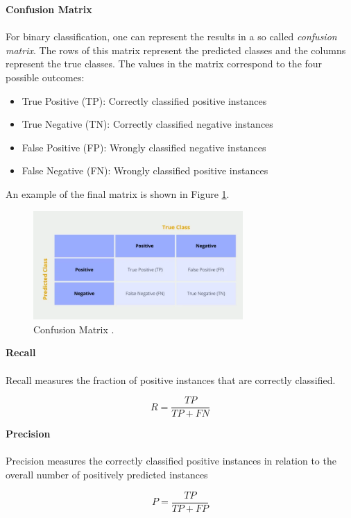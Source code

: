 \textbf{Confusion Matrix} \\ \\
For binary classification, one can represent the results in a so called \textit{confusion matrix}. The rows of this matrix represent the predicted classes and the columns represent the true classes. The values in the matrix correspond to the four possible outcomes:
\begin{itemize}
	\item[\textbullet] True Positive (TP): Correctly classified positive instances
	\item[\textbullet] True Negative (TN): Correctly classified negative instances
	\item[\textbullet] False Positive (FP): Wrongly classified negative instances
	\item[\textbullet] False Negative (FN): Wrongly classified positive instances
\end{itemize}
An example of the final matrix is shown in Figure \ref{fig:confusion-matrix}.
\begin{figure}[h]
  \centering
  \includegraphics[width=8cm]{fig/confusion_matrix.png}
  \caption{Confusion Matrix \cite{confusion}.}%
  \label{fig:confusion-matrix}
\end{figure}

\textbf{Recall} \\ \\
Recall measures the fraction of positive instances that are correctly classified.

\begin{equation}
	R = \frac{TP}{TP + FN}
\end{equation}

\textbf{Precision} \\ \\
Precision measures the correctly classified positive instances in relation to the overall number of positively predicted instances

\begin{equation}
	P = \frac{TP}{TP + FP}
\end{equation}

